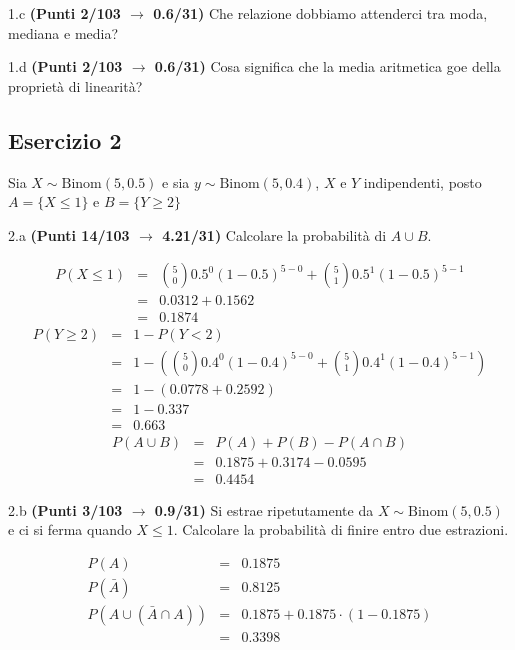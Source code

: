 \documentclass[
  11pt,
]{book}
\theoremstyle{mytheoremstyle}
\theoremstyle{mydefstyle}
\newenvironment{sol}
  {
  \begin{tcolorbox}[enhanced,breakable,arc=0.1mm,boxrule=1pt,colback=white,colframe=iblue,
  title=\bf \fontfamily{lmss}\selectfont \hspace{.5 cm} Soluzione,drop fuzzy shadow]

}{
\end{tcolorbox}
  }
\begin{document}
1.c \textbf{(Punti 2/103 \(\rightarrow\) 0.6/31)} Che relazione dobbiamo attenderci tra moda, mediana e media?

1.d \textbf{(Punti 2/103 \(\rightarrow\) 0.6/31)} Cosa significa che la media aritmetica goe della proprietà di linearità?

\subsection{Esercizio 2}\label{esercizio-2-27}

Sia \(X\sim\text{Binom}(5,0.5)\) e sia \(y\sim\text{Binom}(5,0.4)\), \(X\) e \(Y\) indipendenti, posto \(A=\{X\le 1\}\) e \(B=\{Y\ge 2\}\)

2.a \textbf{(Punti 14/103 \(\rightarrow\) 4.21/31)} Calcolare la probabilità di \(A\cup B\).

\begin{sol}
\normalsize 
\begin{eqnarray*}
      P( X \leq 1 ) &=& \binom{ 5 }{ 0 } 0.5 ^{ 0 }(1- 0.5 )^{ 5 - 0 }+\binom{ 5 }{ 1 } 0.5 ^{ 1 }(1- 0.5 )^{ 5 - 1 } \\                 &=& 0.0312+0.1562 \\                 &=& 0.1874 
   \end{eqnarray*}
\normalsize  \normalsize 
\begin{eqnarray*}
      P( Y \geq 2 ) &=& 1-P( Y < 2 ) \\                 &=& 1-\left( \binom{ 5 }{ 0 } 0.4 ^{ 0 }(1- 0.4 )^{ 5 - 0 }+\binom{ 5 }{ 1 } 0.4 ^{ 1 }(1- 0.4 )^{ 5 - 1 } \right)\\                 &=& 1-( 0.0778+0.2592 )\\                 &=& 1- 0.337 \\                 &=&   0.663 
   \end{eqnarray*}
\normalsize 
\begin{eqnarray*}
  P(A\cup B) &=&  P(A)+P(B)-P(A\cap B)\\
  &=& 0.1875+0.3174-0.0595\\
  &=& 0.4454
\end{eqnarray*}

\end{sol}

2.b \textbf{(Punti 3/103 \(\rightarrow\) 0.9/31)} Si estrae ripetutamente da \(X\sim\text{Binom}(5,0.5)\) e ci si ferma quando \(X\le 1\). Calcolare la probabilità di finire entro due estrazioni.

\begin{sol}
\begin{eqnarray*}
  P(A) &=&  0.1875\\
  P(\bar A) &=& 0.8125\\
  P(A\cup (\bar A\cap A))&=& 0.1875+0.1875\cdot (1-0.1875)\\
  &=& 0.3398
\end{eqnarray*}

\end{sol}
\end{document}
